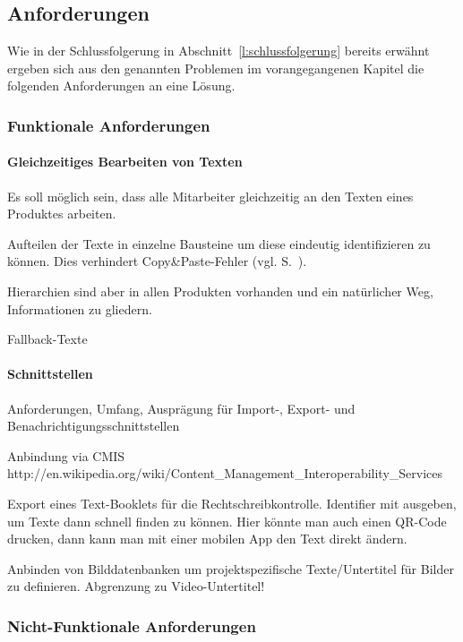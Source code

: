 \subsection{Anforderungen}\label{l:anforderungen}

Wie in der Schlussfolgerung in Abschnitt~\ref{l:schlussfolgerung} bereits erwähnt ergeben sich aus den genannten Problemen im vorangegangenen Kapitel die folgenden Anforderungen an eine Lösung.

\subsubsection{Funktionale Anforderungen}

\TODO

\paragraph{Gleichzeitiges Bearbeiten von Texten} Es soll möglich sein, dass alle  Mitarbeiter gleichzeitig an den Texten eines Produktes arbeiten.


Aufteilen der Texte in einzelne Bausteine um diese eindeutig identifizieren zu können. Dies verhindert Copy\&Paste-Fehler (vgl. S.~\pageref{p:serielles-konzept}).

\label{l:hierarchien} Hierarchien sind aber in allen Produkten vorhanden und ein natürlicher Weg, Informationen zu gliedern. 

Fallback-Texte

\paragraph{Schnittstellen}

Anforderungen, Umfang, Ausprägung für Import-, Export- und Benachrichtigungsschnittstellen

Anbindung via CMIS http://en.wikipedia.org/wiki/Content\_Management\_Interoperability\_Services

Export eines Text-Booklets für die Rechtschreibkontrolle. Identifier mit ausgeben, um Texte dann schnell finden zu können. Hier könnte man auch einen QR-Code drucken, dann kann man mit einer mobilen App den Text direkt ändern.

Anbinden von Bilddatenbanken um projektspezifische Texte/Untertitel für Bilder zu definieren. Abgrenzung zu Video-Untertitel!

\subsubsection{Nicht-Funktionale Anforderungen}


